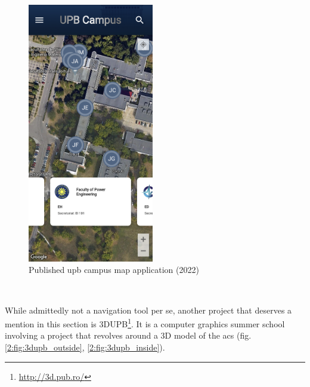 \begin{figure}[!ht]
\begin{minipage}[b]{0.49\textwidth}
             \includegraphics[width=0.49\textwidth]{figures/navigation_apps/upb_campus_new_published2.png}
            \caption{Published \acrshort{upb} campus map application (2022)}
            \label{2:fig:upb_campus_new_published}
        \end{minipage}
    \end{figure}
    
    ~
    
    While admittedly not a navigation tool per se, another project that deserves a mention in this section is 3DUPB\footnote{\url{http://3d.pub.ro/}}. It is a computer graphics summer school involving a project that revolves around a 3D model of the \acrlong{acs} (fig. \ref{2:fig:3dupb_outside}, \ref{2:fig:3dupb_inside}).
    

